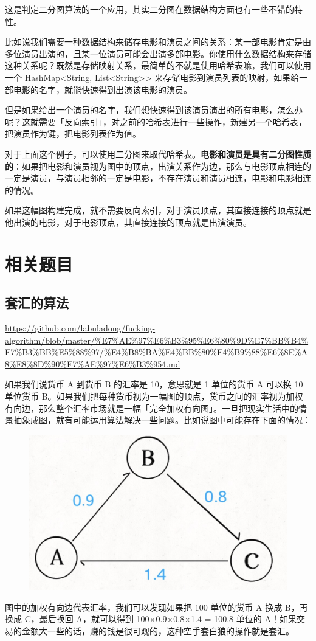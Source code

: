 \documentclass[12pt]{article}
\begin{document}
这是判定二分图算法的一个应用，其实二分图在数据结构方面也有一些不错的特性。

比如说我们需要一种数据结构来储存电影和演员之间的关系：某一部电影肯定是由多位演员出演的，且某一位演员可能会出演多部电影。你使用什么数据结构来存储这种关系呢？既然是存储映射关系，最简单的不就是使用哈希表嘛，我们可以使用一个 HashMap<String, List<String>> 来存储电影到演员列表的映射，如果给一部电影的名字，就能快速得到出演该电影的演员。

但是如果给出一个演员的名字，我们想快速得到该演员演出的所有电影，怎么办呢？这就需要「反向索引」，对之前的哈希表进行一些操作，新建另一个哈希表，把演员作为键，把电影列表作为值。

对于上面这个例子，可以使用二分图来取代哈希表。\textbf{电影和演员是具有二分图性质的}：如果把电影和演员视为图中的顶点，出演关系作为边，那么与电影顶点相连的一定是演员，与演员相邻的一定是电影，不存在演员和演员相连，电影和电影相连的情况。

如果这幅图构建完成，就不需要反向索引，对于演员顶点，其直接连接的顶点就是他出演的电影，对于电影顶点，其直接连接的顶点就是出演演员。


\section{相关题目}
\subsection{套汇的算法}
\url{https://github.com/labuladong/fucking-algorithm/blob/master/%E7%AE%97%E6%B3%95%E6%80%9D%E7%BB%B4%E7%B3%BB%E5%88%97/%E4%B8%BA%E4%BB%80%E4%B9%88%E6%8E%A8%E8%8D%90%E7%AE%97%E6%B3%954.md}

如果我们说货币 A 到货币 B 的汇率是 10，意思就是 1 单位的货币 A 可以换 10 单位货币 B。如果我们把每种货币视为一幅图的顶点，货币之间的汇率视为加权有向边，那么整个汇率市场就是一幅「完全加权有向图」。一旦把现实生活中的情景抽象成图，就有可能运用算法解决一些问题。比如说图中可能存在下面的情况：
\begin{figure}[H]
    \centering
    \includegraphics[width=.5\textwidth]{fig/FA_Graph_Problem_1.png}
\end{figure}
图中的加权有向边代表汇率，我们可以发现如果把 100 单位的货币 A 换成 B，再换成 C，最后换回 A，就可以得到 100×0.9×0.8×1.4 = 100.8 单位的 A！如果交易的金额大一些的话，赚的钱是很可观的，这种空手套白狼的操作就是套汇。
\end{document}

